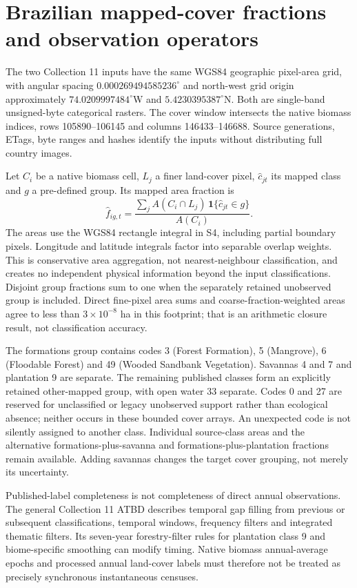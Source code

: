 \documentclass[11pt,a4paper]{article}
\begin{document}
\section{Brazilian mapped-cover fractions and observation operators}

The two Collection 11 inputs have the same WGS84 geographic pixel-area grid, with angular spacing $0.000269494585236^\circ$ and north-west grid origin approximately $74.0209997484^\circ$W and $5.4230395387^\circ$N. Both are single-band unsigned-byte categorical rasters. The cover window intersects the native biomass indices, rows 105890--106145 and columns 146433--146688. Source generations, ETags, byte ranges and hashes identify the inputs without distributing full country images.

Let $C_i$ be a native biomass cell, $L_j$ a finer land-cover pixel, $\widehat c_{jt}$ its mapped class and $g$ a pre-defined group. Its mapped area fraction is
\begin{equation}
\widehat f_{ig,t}=\frac{\sum_j A(C_i\cap L_j)\,\mathbf1\{\widehat c_{jt}\in g\}}{A(C_i)}.
\end{equation}
The areas use the WGS84 rectangle integral in S4, including partial boundary pixels. Longitude and latitude integrals factor into separable overlap weights. This is conservative area aggregation, not nearest-neighbour classification, and creates no independent physical information beyond the input classifications. Disjoint group fractions sum to one when the separately retained unobserved group is included. Direct fine-pixel area sums and coarse-fraction-weighted areas agree to less than $3\times10^{-8}$ ha in this footprint; that is an arithmetic closure result, not classification accuracy.

The formations group contains codes 3 (Forest Formation), 5 (Mangrove), 6 (Floodable Forest) and 49 (Wooded Sandbank Vegetation). Savannas 4 and 7 and plantation 9 are separate. The remaining published classes form an explicitly retained other-mapped group, with open water 33 separate. Codes 0 and 27 are reserved for unclassified or legacy unobserved support rather than ecological absence; neither occurs in these bounded cover arrays. An unexpected code is not silently assigned to another class. Individual source-class areas and the alternative formations-plus-savanna and formations-plus-plantation fractions remain available. Adding savannas changes the target cover grouping, not merely its uncertainty.

Published-label completeness is not completeness of direct annual observations. The general Collection 11 ATBD describes temporal gap filling from previous or subsequent classifications, temporal windows, frequency filters and integrated thematic filters. Its seven-year forestry-filter rules for plantation class 9 and biome-specific smoothing can modify timing. Native biomass annual-average epochs and processed annual land-cover labels must therefore not be treated as precisely synchronous instantaneous censuses.
\end{document}
